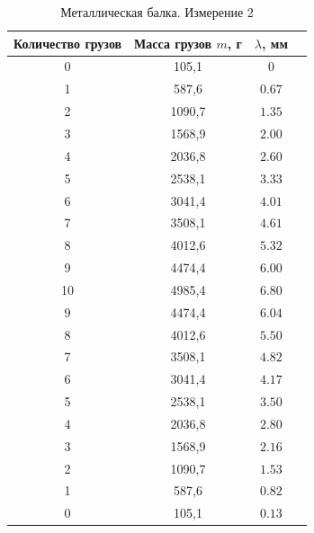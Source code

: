 \documentclass{article}
\begin{document}
\begin{table}[!h]
    \centering
    \begin{tabular}{|c|c|c|c|}
        \hline
         Количество грузов & Масса грузов $m$, г & $\lambda$, мм \\
         \hline
        0  & 105,1  & 0                 \\
        1  & 587,6  & $0.67$  \\
        2  & 1090,7 & $1.35$ \\
        3  & 1568,9 & $2.00$ \\
        4  & 2036,8 & $2.60$ \\
        5  & 2538,1 & $3.33$ \\
        6  & 3041,4 & $4.01$ \\
        7  & 3508,1 & $4.61$ \\
        8  & 4012,6 & $5.32$ \\
        9  & 4474,4 & $6.00$ \\
        10 & 4985,4 & $6.80$ \\
        9  & 4474,4 & $6.04$ \\
        8  & 4012,6 & $5.50$ \\
        7  & 3508,1 & $4.82$ \\
        6  & 3041,4 & $4.17$ \\
        5  & 2538,1 & $3.50$ \\
        4  & 2036,8 & $2.80$ \\
        3  & 1568,9 & $2.16$ \\
        2  & 1090,7 & $1.53$ \\
        1  & 587,6  & $0.82$  \\
        0  & 105,1  & $0.13$  \\
        \hline
    \end{tabular}
    \caption{Металлическая балка. Измерение 2}
\end{table}
\end{document}
